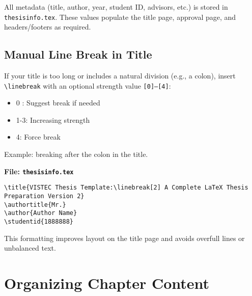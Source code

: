 \begin{paragraph}
All metadata (title, author, year, student ID, advisors, etc.) is stored in \texttt{thesisinfo.tex}. These values populate the title page, approval page, and headers/footers as required.
\end{paragraph}

\subsection{Manual Line Break in Title}
\label{ch3:metadata-linebreak}

\begin{subparagraph}
If your title is too long or includes a natural division (e.g., a colon), insert \verb|\linebreak| with an optional strength value \texttt{[0]–[4]}:
\end{subparagraph}

\begin{itemize}[leftmargin=\subparitemindent]
    \item 0 : Suggest break if needed
    \item 1-3: Increasing strength
    \item 4: Force break
\end{itemize}

\begin{subparagraph}
Example: breaking after the colon in the title.
\end{subparagraph}

\noindent\textbf{File: \texttt{thesisinfo.tex}}\vspace{-1em}
\begin{verbatim}
\title{VISTEC Thesis Template:\linebreak[2] A Complete LaTeX Thesis Preparation Version 2}
\authortitle{Mr.}
\author{Author Name}
\studentid{1888888}
\end{verbatim}

\begin{subparagraph}
This formatting improves layout on the title page and avoids overfull lines or unbalanced text.
\end{subparagraph}


\section{Organizing Chapter Content}
\label{ch3:chapters}

